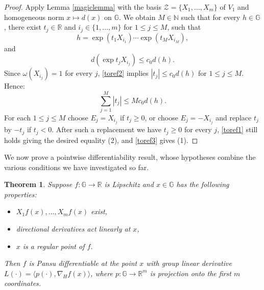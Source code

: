 \documentclass[reqno, 11pt]{amsart}
\newtheorem{theorem}{Theorem}
\theoremstyle{definition}
\theoremstyle{remark}
\numberwithin{theorem}{section}
\numberwithin{equation}{section}
\begin{document}
\begin{proof}
Apply Lemma \ref{magiclemma} with the basis $\mathcal{Z}=\{X_{1}, \ldots, X_{m}\}$ of $V_{1}$ and homogeneous norm $x\mapsto d(x)$ on $\mathbb{G}$. We obtain $M\in \mathbb{N}$ such that for every $h\in \mathbb{G}$, there exist $t_{j}\in \mathbb{R}$ and $i_{j}\in \{1, \ldots, m\}$ for $1\leq j\leq M$, such that
\begin{equation}\label{toref1}
h=\exp(t_{1}X_{i_{1}})\cdots \exp(t_{M}X_{i_{M}}),
\end{equation}
and
\begin{equation}\label{toref2}
d(\exp t_{j}X_{i_{j}})\leq c_{0}d(h).
\end{equation}
Since $\omega(X_{i_{j}})=1$ for every $j$, \eqref{toref2} implies $|t_{j}|\leq c_{0}d(h)$ for $1\leq j\leq M$. Hence:
\begin{equation}\label{toref3}
\sum_{j=1}^{M} |t_{j}|\leq Mc_{0}d(h).
\end{equation}
For each $1\leq j\leq M$ choose $E_{j}=X_{i_{j}}$ if $t_{j}\geq 0$, or choose $E_{j}=-X_{i_{j}}$ and replace $t_{j}$ by $-t_{j}$ if $t_{j}<0$. After such a replacement we have $t_{j}\geq 0$ for every $j$, \eqref{toref1} still holds giving the desired equality (2), and \eqref{toref3} gives (1).
\end{proof}

We now prove a pointwise differentiability result, whose hypotheses combine the various conditions we have investigated so far.

\begin{theorem}\label{differentiableatlast}
Suppose $f\colon \mathbb{G}\to \mathbb{R}$ is Lipschitz and $x\in \mathbb{G}$ has the following properties:
\begin{itemize}
\item $X_{1}f(x), \ldots, X_{m}f(x)$ exist,
\item directional derivatives act linearly at $x$,
\item $x$ is a regular point of $f$.
\end{itemize}
Then $f$ is Pansu differentiable at the point $x$ with group linear derivative $L(\cdot)=\langle p(\cdot), \nabla_{H}f(x) \rangle$, where $p\colon \mathbb{G}\to \mathbb{R}^{m}$ is projection onto the first $m$ coordinates.
\end{theorem}
\end{document}
